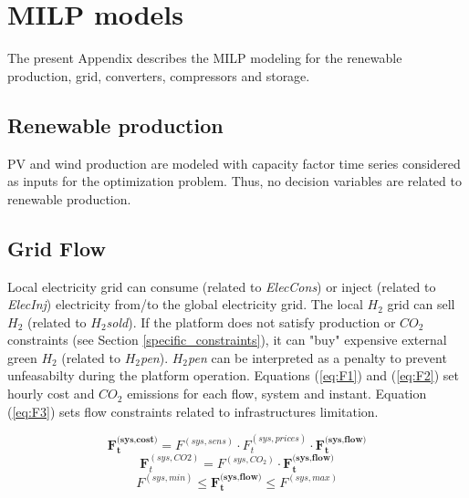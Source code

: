 \section{MILP models} \label{app:model}
The present Appendix describes the MILP modeling for the renewable production, grid, converters, compressors and storage.
\subsection{Renewable production} \label{Renewable_production}

PV and wind production are modeled with capacity factor time series considered as inputs for the optimization problem. Thus, no decision variables are related to renewable production.

\subsection{Grid Flow} \label{Grid_Flow} \label{eq:F}
Local electricity grid can consume (related to \textit{ElecCons}) or inject (related to \textit{ElecInj}) electricity from/to the global electricity grid. The local $H_2$ grid can sell $H_2$ (related to \textit{$H_2$sold}). If the platform does not satisfy production or $CO_2$ constraints (see Section \ref{specific_constraints}), it can "buy" expensive external green $H_2$ (related to \textit{$H_2$pen}). \textit{$H_2$pen} can be interpreted as a penalty to prevent unfeasabilty during the platform operation. Equations (\ref{eq:F1}) and (\ref{eq:F2}) set hourly cost and $CO_2$ emissions for each flow, system and instant. Equation (\ref{eq:F3}) sets flow constraints related to infrastructures limitation.

\begin{equation} \tag{F.1} \label{eq:F1}
    \textbf{F}_\textbf{t}^{\textbf{(sys,cost)}} = F^{(sys,sens)} \cdot F_t^{(sys,prices)} \cdot \textbf{F}_\textbf{t}^{\textbf{(sys,flow)}}
\end{equation}
\begin{equation} \tag{F.2} \label{eq:F2}
    \textbf{F}_t^{(sys,CO2)} = F^{(sys,CO_2)} \cdot \textbf{F}_\textbf{t}^{\textbf{(sys,flow)}}
\end{equation}
\begin{equation} \tag{F.3} \label{eq:F3}
    F^{(sys,min)} \leq \textbf{F}_\textbf{t}^{\textbf{(sys,flow)}} \leq F^{(sys,max)}
\end{equation}
